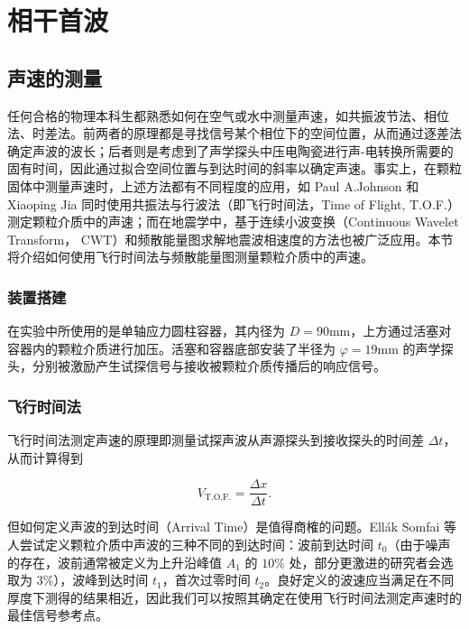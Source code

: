 
\chapter{相干首波}

\section{声速的测量}

任何合格的物理本科生都熟悉如何在空气或水中测量声速，如共振波节法、相位法、时差法。前两者的原理都是寻找信号某个相位下的空间位置，从而通过逐差法确定声波的波长；后者则是考虑到了声学探头中压电陶瓷进行声-电转换所需要的固有时间，因此通过拟合空间位置与到达时间的斜率以确定声速。事实上，在颗粒固体中测量声速时，上述方法都有不同程度的应用，如 Paul A.Johnson 和 Xiaoping Jia 同时使用共振法与行波法（即飞行时间法，Time of Flight, T.O.F.）测定颗粒介质中的声速\cite{Johnson_2005}；而在地震学中，基于连续小波变换（Continuous Wavelet Transform， CWT）和频散能量图求解地震波相速度的方法也被广泛应用。本节将介绍如何使用飞行时间法与频散能量图测量颗粒介质中的声速。

\subsection{装置搭建}

在实验中所使用的是单轴应力圆柱容器，其内径为 $D = 90\unit{\milli\meter}$，上方通过活塞对容器内的颗粒介质进行加压。活塞和容器底部安装了半径为 $\varphi = 19\unit{\milli\meter}$ 的声学探头，分别被激励产生试探信号与接收被颗粒介质传播后的响应信号。

\subsection{飞行时间法}

飞行时间法测定声速的原理即测量试探声波从声源探头到接收探头的时间差 $\Delta t$，从而计算得到

\begin{equation}
  V_{\text{T.O.F.}} = \frac{\Delta x}{\Delta t}.
\end{equation}

但如何定义声波的到达时间（Arrival Time）是值得商榷的问题。Ellák Somfai 等人尝试定义颗粒介质中声波的三种不同的到达时间：波前到达时间 $t_{0}$（由于噪声的存在，波前通常被定义为上升沿峰值 $A_{1}$ 的 $\num{10}\%$ 处，部分更激进的研究者会选取为 $3\%$），波峰到达时间 $t_{1}$，首次过零时间 $t_{2}$\cite{PhysRevE.72.021301}。良好定义的波速应当满足在不同厚度下测得的结果相近，因此我们可以按照其确定在使用飞行时间法测定声速时的最佳信号参考点。

